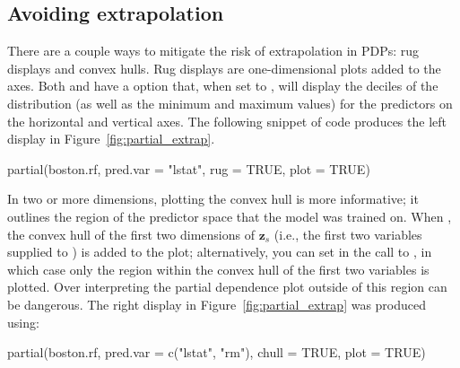 

\subsection{Avoiding extrapolation}

There are a couple ways to mitigate the risk of extrapolation in PDPs: rug displays and convex hulls. Rug displays are one-dimensional plots added to the axes. Both  and  have a  option that, when set to , will display the deciles of the distribution (as well as the minimum and maximum values) for the predictors on the horizontal and vertical axes. The following snippet of code produces the left display in Figure~\ref{fig:partial_extrap}. %
\begin{example}
partial(boston.rf, pred.var = "lstat", rug = TRUE, plot = TRUE)
\end{example}

In two or more dimensions, plotting the convex hull is more informative; it outlines the region of the predictor space that the model was trained on. When , the convex hull of the first two dimensions of $\boldsymbol{z}_s$ (i.e., the first two variables supplied to ) is added to the plot; alternatively, you can set  in the call to , in which case only the region within the convex hull of the first two variables is plotted. Over interpreting the partial dependence plot outside of this region can be dangerous. The right display in Figure~\ref{fig:partial_extrap} was produced using:
\begin{example}
partial(boston.rf, pred.var = c("lstat", "rm"), chull = TRUE, plot = TRUE)
\end{example}

